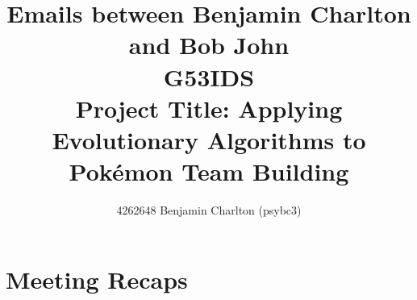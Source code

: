 \documentclass[a4paper]{article}
\newcommand{\Pokemon}{Pok\'{e}mon}
\begin{document}
\title{
    Emails between Benjamin Charlton and Bob John
    \\ \large{G53IDS}
    \\ \large{Project Title: Applying Evolutionary Algorithms to \Pokemon{} Team Building}\vspace{-3ex}}
    \author{4262648 Benjamin Charlton (psybc3)
    \date{}}

\maketitle

\section{Meeting Recaps}
\end{document}
